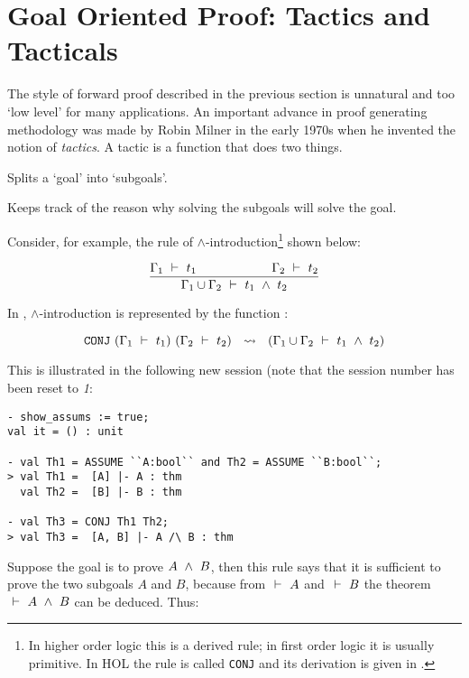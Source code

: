 \section{Goal Oriented Proof: Tactics and Tacticals}
\label{backward}\label{tactics}

The style of forward proof described in the previous section is
unnatural and too `low level' for many applications. An important
advance in proof generating methodology was made by Robin Milner in
the early 1970s when he invented the notion of {\it tactics\/}. A
tactic is a function that does two things.
\begin{myenumerate}
\item Splits a `goal' into `subgoals'.
\item Keeps track of the reason why solving the subgoals will solve the goal.
\end{myenumerate}

\noindent Consider, for example, the  rule of $\wedge$-introduction\footnote{In
  higher order logic this is a derived rule; in first order logic it
  is usually primitive.  In HOL the rule is called {\tt CONJ} and its
  derivation is given in \DESCRIPTION.}  shown below:

\[ \frac{\Gamma_1\ \vdash\ 
t_1\qquad\qquad\qquad\Gamma_2\ \vdash\  t_2}{\Gamma_1\cup\Gamma_2 \ \vdash\  t_1\ \wedge\ 
t_2} \]


\noindent In \HOL,  $\wedge$-introduction is  represented by  the \ML{} function
:

\[\ml{CONJ}\ (\Gamma_1\turn t_1)\ (\Gamma_2\turn t_2) \ \ \leadsto\
\ (\Gamma_1\cup\Gamma_2\turn  t_1\conj  t_2)\]

\noindent  This  is   illustrated  in  the
following new session (note that the session number has been reset to
{\small\sl 1}:

\setcounter{sessioncount}{0}
\begin{session}\begin{verbatim}
- show_assums := true;
val it = () : unit

- val Th1 = ASSUME ``A:bool`` and Th2 = ASSUME ``B:bool``;
> val Th1 =  [A] |- A : thm
  val Th2 =  [B] |- B : thm

- val Th3 = CONJ Th1 Th2;
> val Th3 =  [A, B] |- A /\ B : thm
\end{verbatim}\end{session}

    Suppose the goal is to prove $A\ \wedge\  B$, then this rule says that
    it is sufficient to prove the two subgoals $A$ and $B$, because
    from $\ \vdash\  A$ and $\ \vdash\  B$ the theorem $\ \vdash\  A\ \wedge\  B$ can be
    deduced. Thus:


